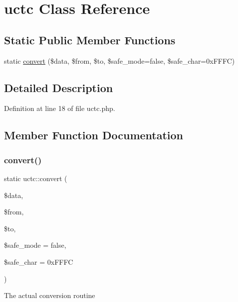 \hypertarget{classuctc}{}\section{uctc Class Reference}
\label{classuctc}
\subsection*{Static Public Member Functions}
\begin{DoxyCompactItemize}
\item 
static \hyperlink{classuctc_ae0606c0be3e12ff1184b52a463754a86}{convert} (\$data, \$from, \$to, \$safe\+\_\+mode=false, \$safe\+\_\+char=0x\+F\+F\+F\+C)
\end{DoxyCompactItemize}


\subsection{Detailed Description}


Definition at line 18 of file uctc.\+php.



\subsection{Member Function Documentation}
\mbox{\label{classuctc_ae0606c0be3e12ff1184b52a463754a86}} 
\subsubsection{\texorpdfstring{convert()}{convert()}}
{\footnotesize\ttfamily static uctc\+::convert (\begin{DoxyParamCaption}\item[{}]{\$data,  }\item[{}]{\$from,  }\item[{}]{\$to,  }\item[{}]{\$safe\+\_\+mode = {\ttfamily false},  }\item[{}]{\$safe\+\_\+char = {\ttfamily 0xFFFC} }\end{DoxyParamCaption})\hspace{0.3cm}{\ttfamily [static]}}

The actual conversion routine


